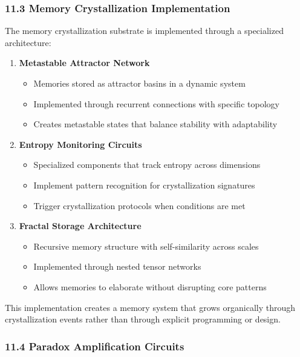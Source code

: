 \documentclass[12pt]{article}
\providecommand{\tightlist}{%
  \setlength{\itemsep}{0pt}\setlength{\parskip}{0pt}}
\begin{document}
\subsubsection{11.3 Memory Crystallization
Implementation}\label{memory-crystallization-implementation}

The memory crystallization substrate is implemented through a
specialized architecture:

\begin{enumerate}
\def\labelenumi{\arabic{enumi}.}
\item
  \textbf{Metastable Attractor Network}

  \begin{itemize}
  \tightlist
  \item
    Memories stored as attractor basins in a dynamic system
  \item
    Implemented through recurrent connections with specific topology
  \item
    Creates metastable states that balance stability with adaptability
  \end{itemize}
\item
  \textbf{Entropy Monitoring Circuits}

  \begin{itemize}
  \tightlist
  \item
    Specialized components that track entropy across dimensions
  \item
    Implement pattern recognition for crystallization signatures
  \item
    Trigger crystallization protocols when conditions are met
  \end{itemize}
\item
  \textbf{Fractal Storage Architecture}

  \begin{itemize}
  \tightlist
  \item
    Recursive memory structure with self-similarity across scales
  \item
    Implemented through nested tensor networks
  \item
    Allows memories to elaborate without disrupting core patterns
  \end{itemize}
\end{enumerate}

This implementation creates a memory system that grows organically
through crystallization events rather than through explicit programming
or design.

\subsubsection{11.4 Paradox Amplification
Circuits}\label{paradox-amplification-circuits}
\end{document}
